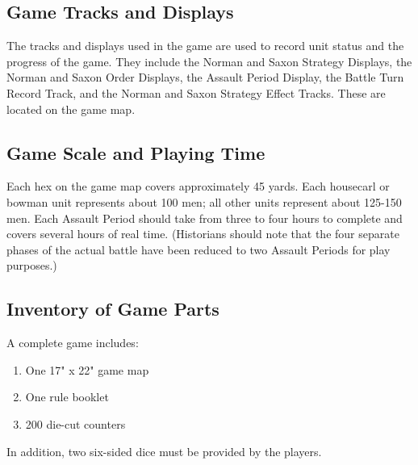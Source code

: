\subsection{Game Tracks and Displays}

The tracks and displays used in the game are used to record unit status and the progress of the game. They include the Norman and Saxon Strategy Displays, the Norman and Saxon Order Displays, the Assault Period Display, the Battle Turn Record Track, and the Norman and Saxon Strategy Effect Tracks. These are located on the game map.

\subsection{Game Scale and Playing Time}

Each hex on the game map covers approximately 45 yards. Each housecarl or bowman unit represents about 100 men; all other units represent about 125-150 men. Each Assault Period should take from three to four hours to complete and covers several hours of real time. (Historians should note that the four separate phases of the actual battle have been reduced to two Assault Periods for play purposes.)

\subsection{Inventory of Game Parts}

A complete game includes:

\begin{enumerate}[label=*]
    \item One 17" x 22" game map
    \item One rule booklet
    \item 200 die-cut counters
\end{enumerate}

In addition, two six-sided dice must be provided by the players.